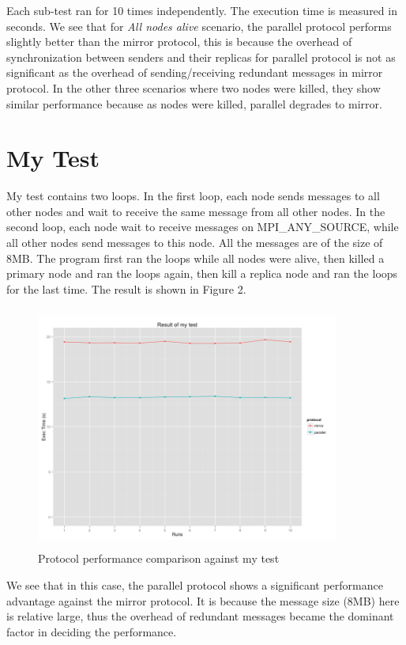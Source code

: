 \documentclass[11pt]{article}
\begin{document}
Each sub-test ran for 10 times independently. The execution time is
measured in seconds. We see that for \emph{All nodes alive} scenario,
the parallel protocol performs slightly better than the mirror
protocol, this is because the overhead of synchronization between
senders and their replicas for parallel protocol is not as significant
as the overhead of sending/receiving redundant messages in mirror
protocol. In the other
three scenarios where two nodes were killed, they show similar
performance because as nodes were killed, parallel degrades to
mirror. 

\section*{My Test}
My test contains two loops. In the first loop, each node sends
messages to all other nodes and wait to receive the same message from
all other nodes. In the second loop, each node wait to receive
messages on MPI\_ANY\_SOURCE, while all other nodes send messages to
this node. All the messages are of the size of 8MB. The program first
ran the loops while all nodes were alive, then killed a primary node
and ran the loops again, then kill a replica node and ran the loops
for the last time. The result is shown in Figure 2.

\begin{figure}
  \centering
  \includegraphics[width=10cm,height=8cm]{mytest.png}
  \caption{Protocol performance comparison against my test}
  \FloatBarrier
\end{figure}

We see that in this case, the parallel protocol shows a significant
performance advantage against the mirror protocol. It is because
the message size (8MB) here is relative large, thus the overhead of
redundant messages became the dominant factor in deciding the
performance.
\end{document}

